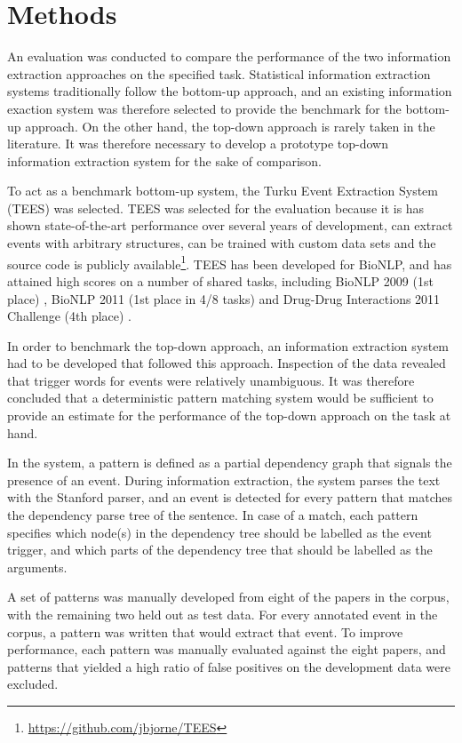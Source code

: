 \section{Methods}

An evaluation was conducted to compare the performance of the two information extraction approaches on the specified task. Statistical information extraction systems traditionally follow the bottom-up approach, and an existing information exaction system was therefore selected to provide the benchmark for the bottom-up approach. On the other hand, the top-down approach is rarely taken in the literature. It was therefore necessary to develop a prototype top-down information extraction system for the sake of comparison.

To act as a benchmark bottom-up system, the Turku Event Extraction System (TEES) \citep{bjö11ddi} was selected. TEES was selected for the evaluation because it is has shown state-of-the-art performance over several years of development, can extract events with arbitrary structures, can be trained with custom data sets and the source code is publicly available\footnote{\url{https://github.com/jbjorne/TEES}}. TEES has been developed for BioNLP, and has attained high scores on a number of shared tasks, including BioNLP 2009 (1st place) \citep{bjö09}, BioNLP 2011 (1st place in 4/8 tasks) \citep{bjö11} and Drug-Drug Interactions 2011 Challenge (4th place) \citep{bjö11ddi}.


In order to benchmark the top-down approach, an information extraction system had to be developed that followed this approach. Inspection of the data revealed that trigger words for events were relatively unambiguous. It was therefore concluded that a deterministic pattern matching system would be sufficient to provide an estimate for the performance of the top-down approach on the task at hand.

In the system, a pattern is defined as a partial dependency graph that signals the presence of an event. During information extraction, the system parses the text with the Stanford parser\citep{kle03}, and an event is detected for every pattern that matches the dependency parse tree of the sentence. In case of a match, each pattern specifies which node(s) in the dependency tree should be labelled as the event trigger, and which parts of the dependency tree that should be labelled as the arguments. 

A set of patterns was manually developed from eight of the papers in the corpus, with the remaining two held out as test data. For every annotated event in the corpus, a pattern was written that would extract that event. To improve performance, each pattern was manually evaluated against the eight papers, and patterns that yielded a high ratio of false positives on the development data were excluded.


